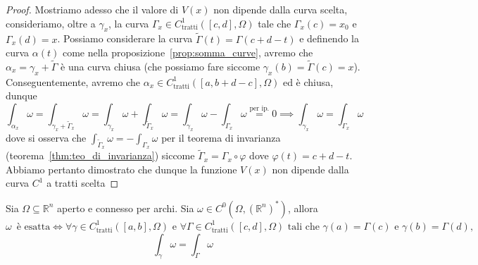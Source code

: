 \begin{proof}
Mostriamo adesso che il valore di $V(x)$ non dipende dalla curva scelta, consideriamo, oltre a $\gamma_x$, la curva $\Gamma_x \in C^1_\text{tratti}([c, d], \Omega)$ tale che $\Gamma_x(c) = x_0$ e $\Gamma_x(d) = x$. Possiamo considerare la curva $\tilde{\Gamma}(t) = \Gamma(c + d - t)$ e definendo la curva $\alpha(t)$ come nella proposizione~\ref{prop:somma_curve}, avremo che $\alpha_x = \gamma_x + \tilde{\Gamma}$ è una curva chiusa (che possiamo fare
siccome $\gamma_x(b) = \tilde{\Gamma}(c) = x$). \\
Conseguentemente, avremo che $\alpha_x \in C^1_\text{tratti}([a, b+d-c], \Omega)$ ed è chiusa, dunque
$$
\int_{\alpha_x} \omega = \int_{\gamma_x + \tilde{\Gamma}_x} \omega = \int_{\gamma_x} \omega + \int_{\tilde{\Gamma}_x} \omega = \int_{\gamma_x} \omega - \int_{\Gamma_x} \omega \stackrel{\text{per ip.}}{=} 0 \implies \int_{\gamma_x} \omega= \int_{\Gamma_x} \omega
$$
dove si osserva che $\int_{\tilde{\Gamma}_x} \omega = - \int_{\Gamma_x} \omega$ per il teorema di invarianza (teorema~\ref{thm:teo_di_invarianza}) siccome $\tilde{\Gamma}_x = \Gamma_x \circ \varphi$ dove $\varphi(t) = c + d - t$. Abbiamo pertanto dimostrato che dunque la funzione $V(x)$ non dipende dalla curva $C^1$ a tratti scelta
\end{proof}
\begin{theorem}[CF2]
	Sia $\Omega \subseteq \mathbb{R}^n$ aperto e connesso per archi. Sia $\omega \in C^0(\Omega, (\mathbb{R}^n)^*)$, allora $\omega \, \text{ è esatta} \iff \forall \gamma \in C^1_\text{tratti}([a,b], \Omega) \text{ e } \forall \Gamma \in C^1_\text{tratti}([c,d], \Omega) \text{ tali che } \gamma(a) = \Gamma(c) \text{ e } \gamma(b) = \Gamma(d), $
	$$ 
	\int_\gamma \omega = \int_\Gamma \omega
	$$
\end{theorem}
